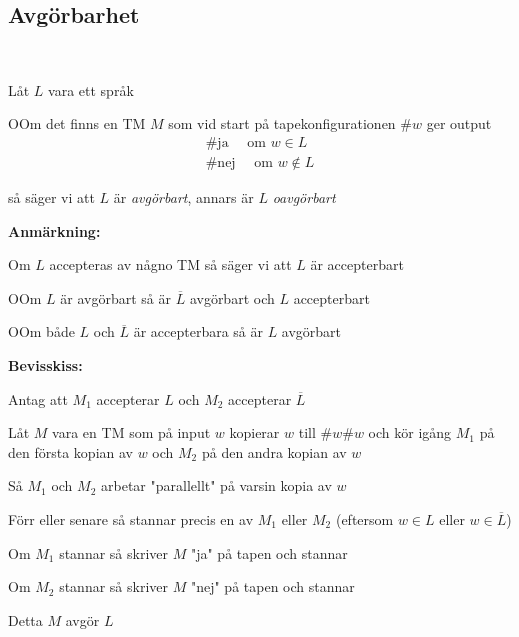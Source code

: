 \subsection{Avgörbarhet}\hfill\\\par
\noindent Låt $L$ vara ett språk
\par\bigskip
\begin{theo}
  OOm det finns en TM $M$ som vid start på tapekonfigurationen $\#w$ ger output
  \begin{equation*}
    \begin{gathered}
      \#\text{ja}\quad\text{ om } w\in L\\
      \#\text{nej}\quad\text{ om } w\notin L
    \end{gathered}
  \end{equation*}\par
  \noindent så säger vi att $L$ är \textit{avgörbart}, annars är $L$ \textit{oavgörbart}
\end{theo}
\par\bigskip
\noindent\textbf{Anmärkning:}\par
\noindent Om $L$ accepteras av någno TM så säger vi att $L$ är accepterbart
\par\bigskip
\begin{theo}
  OOm $L$ är avgörbart så är $\overline{L}$ avgörbart och $L$ accepterbart
\end{theo}
\par\bigskip
\begin{theo}
  OOm både $L$ och $\overline{L}$ är accepterbara så är $L$ avgörbart
\end{theo}
\par\bigskip
\noindent\textbf{Bevisskiss:}\par
\noindent Antag att $M_1$ accepterar $L$ och $M_2$ accepterar $\overline{L}$\par
\noindent Låt $M$ vara en TM som på input $w$ kopierar $w$ till $\#w\#w$ och kör igång $M_1$ på den första kopian av $w$ och $M_2$ på den andra kopian av $w$
\par\bigskip
\noindent Så $M_1$ och $M_2$ arbetar "parallellt" på varsin kopia av $w$\par
\noindent Förr eller senare så stannar precis en av $M_1$ eller $M_2$ (eftersom $w\in L$ eller $w\in\overline{L}$)\par
\noindent Om $M_1$ stannar så skriver $M$ "ja" på tapen och stannar\par
\noindent Om $M_2$ stannar så skriver $M$ "nej" på tapen och stannar\par
\noindent Detta $M$ avgör $L$
